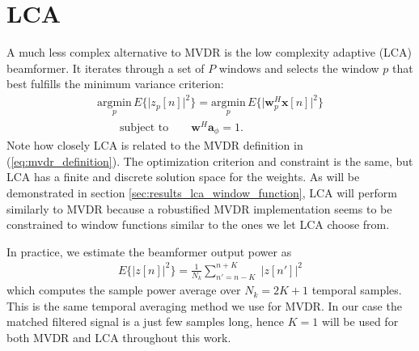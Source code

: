 \documentclass[10pt,journal,draftclsnofoot,onecolumn]{IEEEtran}
\let\MYoriglatexcaption\caption               %
\renewcommand{\caption}[2][\relax]{\MYoriglatexcaption[#2]{#2}}
\newcommand\eq[1]{(\ref{#1})}
\newcommand\nn{\nonumber\\}
\newcommand\argmin[1]{\text{arg}\;\underset{#1}{\text{min}}}
\newcommand\sumb[2]{\sum\limits_{#1}^{#2}\;}
\renewcommand\H{^{\scriptscriptstyle H}}
\renewcommand\vec[1]{\boldsymbol{#1}}
\newcommand\1{\vec 1}
\renewcommand*\a{\vec a}
\newcommand*\w{\vec w}
\newcommand*\x{\vec x}
\renewcommand\argmin{\text{argmin}}
\begin{document}

% 


\section{LCA}\label{sec:lca}

A much less complex alternative to MVDR is the low complexity adaptive (LCA) beamformer. It iterates through a set of $P$ windows and selects the window $p$ that best fulfills the minimum variance criterion:
%
\begin{align}
\underset{p}{\argmin}\, E\{\big|z_p[n]\big|^2\} = \underset{p}{\argmin}\, E\big\{\big|\w_{p}\H\x[n]\big|^2\big\}\nn
\qquad\text{subject to}\qquad \w\H\a_\phi = 1.\label{eq:lca_definition}
\end{align}\label{lca_criterion}
%
Note how closely LCA is related to the MVDR definition in \eq{eq:mvdr_definition}. The optimization criterion and constraint is the same, but LCA has a finite and discrete solution space for the weights. As will be demonstrated in section \ref{sec:results_lca_window_function}, LCA will perform similarly to MVDR because a robustified MVDR implementation seems to be constrained to window functions similar to the ones we let LCA choose from.

In practice, we estimate the beamformer output power as
%
\begin{align*}
E\big\{\big|z[n]\big|^2\big\} = \frac{1}{N_k} \sumb{n'=n-K}{n+K} \big| z[n'] \big|^2
\end{align*}
%
which computes the sample power average over $N_k=2K+1$ temporal samples. This is the same temporal averaging method we use for MVDR. In our case the matched filtered signal is a just few samples long, hence $K=1$ will be used for both MVDR and LCA throughout this work.
\end{document}
